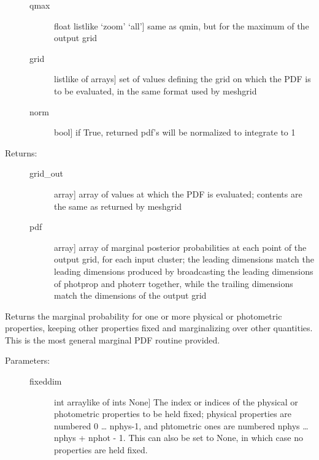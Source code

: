 \documentclass[letterpaper,10pt,english]{sphinxmanual}
\begin{document}
\begin{fulllineitems}
\begin{fulllineitems}
\begin{description}
\begin{description}
\item[{qmax}] \leavevmode{[}float \textbar{} listlike \textbar{} ‘zoom’ \textbar{} ‘all’{]}
same as qmin, but for the maximum of the output grid

\item[{grid}] \leavevmode{[}listlike of arrays{]}
set of values defining the grid on which the PDF is to
be evaluated, in the same format used by meshgrid

\item[{norm}] \leavevmode{[}bool{]}
if True, returned pdf’s will be normalized to integrate
to 1

\end{description}

\item[{Returns:}] \leavevmode\begin{description}
\item[{grid\_out}] \leavevmode{[}array{]}
array of values at which the PDF is evaluated; contents
are the same as returned by meshgrid

\item[{pdf}] \leavevmode{[}array{]}
array of marginal posterior probabilities at each point
of the output grid, for each input cluster; the leading
dimensions match the leading dimensions produced by
broadcasting the leading dimensions of photprop and
photerr together, while the trailing dimensions match
the dimensions of the output grid

\end{description}

\end{description}

\end{fulllineitems}


\begin{fulllineitems}
\label{\detokenize{bayesphot:slugpy.bayesphot.bp.bp.mpdf_gen}}
Returns the marginal probability for one or more physical or
photometric properties, keeping other properties fixed and
marginalizing over other quantities. This is the most general
marginal PDF routine provided.
\begin{description}
\item[{Parameters:}] \leavevmode\begin{description}
\item[{fixeddim}] \leavevmode{[}int \textbar{} arraylike of ints \textbar{} None{]}
The index or indices of the physical or photometric
properties to be held fixed; physical properties are
numbered 0 … nphys-1, and phtometric ones are numbered
nphys … nphys + nphot - 1. This can also be set to
None, in which case no properties are held fixed.


\end{description}
\end{description}
\end{fulllineitems}
\end{fulllineitems}
\end{document}
